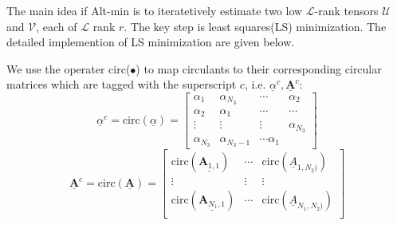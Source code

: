 \documentclass[journal,article,submit,moreauthors,pdftex,10pt,a4paper]{Definitions/mdpi}
\theoremstyle{plain}
\theoremstyle{definition}
\theoremstyle{remark}
\begin{document}
The main idea if Alt-min is to iteratetively estimate two low $\mathcal{L}$-rank tensors $\mathcal{U}$ and $\mathcal{V}$, each of $\mathcal{L}$ rank $r$. The key step is least 
squares(LS) minimization. The detailed implemention of LS minimization are given below.

We use the operater circ($\bullet$) to map circulants to their corresponding circular matrices which are tagged with the superscript $c$, i.e. $\underline{\alpha}^c, \underline{\mathbf{A}}^c$:
\[
    \underline{\alpha}^c = \text{circ}(\underline{\alpha}) = \begin{bmatrix}
        \alpha_1 & \alpha_{N_3} & \cdots  & \alpha_2 \\
        \alpha_2 & \alpha_1 & \cdots & \cdots \\
        \vdots & \vdots & \vdots & \alpha_{N_3} \\
        \alpha_{N_3} & \alpha_{N_3-1} & \cdots \alpha_1
    \end{bmatrix}
    \]
    \[
        \underline{\mathbf{A}}^c = \text{circ}(\underline{\mathbf{A}}) = \begin{bmatrix}
            \text{circ}(\underline{\mathbf{A}_{1,1}})  & \cdots & \text{circ}(\underline{A}_{1,N_2)}) \\
            \vdots & \vdots & \vdots \\
            \text{circ}(\underline{\mathbf{A}_{N_1,1}})  & \cdots & \text{circ}(\underline{A}_{N_1,N_2)}) \\
        \end{bmatrix}
        \]
\end{document}
